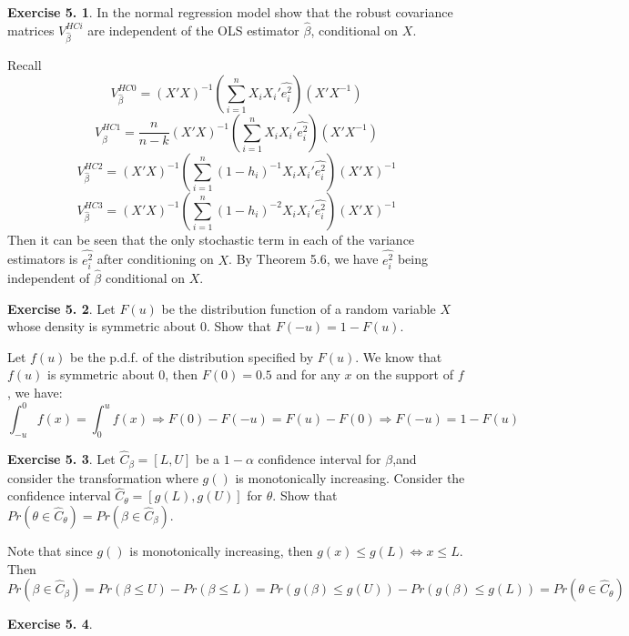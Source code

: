 \documentclass[12pt,letterpaper,reqno]{amsart}
\theoremstyle{plain}
\theoremstyle{definition}
\theoremstyle{definition}
\newtheorem{Exercise}{Exercise 5.}
\numberwithin{equation}{section}
\begin{document}
\begin{Exercise} In the normal regression model show that the robust covariance matrices $V_{\hat{\beta}}^{HCi}$ are independent of the OLS estimator $\hat{\beta}$, conditional on $X$. 

Recall
    \[
    V_{\hat{\beta}}^{HC0} = (X'X)^{-1} (\sum_{i=1}^n X_iX_i' \widehat{e_i^2} ) (X'X^{-1}) 
    \]
    \[
    V_{\hat{\beta}}^{HC1} = \frac{n}{n-k} (X'X)^{-1} (\sum_{i=1}^n X_iX_i' \widehat{e_i^2} ) (X'X^{-1}) 
    \]
    \[
    V_{\hat{\beta}}^{HC2} = (X'X)^{-1} (\sum_{i=1}^n (1-h_i)^{-1} X_iX_i' \widehat{e_i^2} ) (X'X)^{-1}
    \]
    \[
    V_{\hat{\beta}}^{HC3} = (X'X)^{-1} (\sum_{i=1}^n (1-h_i)^{-2} X_iX_i' \widehat{e_i^2} ) (X'X)^{-1}
    \]
Then it can be seen that the only stochastic term in each of the variance estimators is $\widehat{e_i^2}$ after conditioning on $X$. By Theorem 5.6, we have $\widehat{e_i^2}$ being independent of $\hat{\beta}$ conditional on $X$. 
\end{Exercise}

\begin{Exercise} Let $F(u)$ be the distribution function of a random variable $X$ whose density is symmetric about $0$. Show that $F(-u) = 1-F(u)$.

    Let $f(u)$ be the p.d.f. of the distribution specified by $F(u)$. We know that $f(u)$ is symmetric about $0$, then $F(0)=0.5$ and for any $x$ on the support of $f$, we have:
    \[
    \int_{-u}^0f(x) = \int_0^uf(x) \Rightarrow F(0) - F(-u) = F(u) - F(0) \Rightarrow F(-u) = 1-F(u)
    \]
\end{Exercise}

\begin{Exercise} Let $\hat{C}_\beta=[L,U]$ be a $1-\alpha$ confidence interval for $\beta$,and consider the transformation where $g()$ is monotonically increasing. Consider the confidence interval $\hat{C}_\theta = [g(L),g(U)]$ for $\theta$. Show that $Pr(\theta \in \hat{C}_\theta) = Pr(\beta \in \hat{C}_\beta)$.

    Note that since $g()$ is monotonically increasing, then $g(x) \le g(L) \Leftrightarrow x \le L$. Then
    \[
    Pr(\beta \in \hat{C}_\beta) = Pr(\beta \le U) - Pr(\beta \le L) = Pr(g(\beta) \le g(U)) - Pr(g(\beta) \le g(L)) = Pr(\theta \in \hat{C}_\theta) 
    \]

\end{Exercise}

\begin{Exercise} \end{Exercise}
\end{document}
